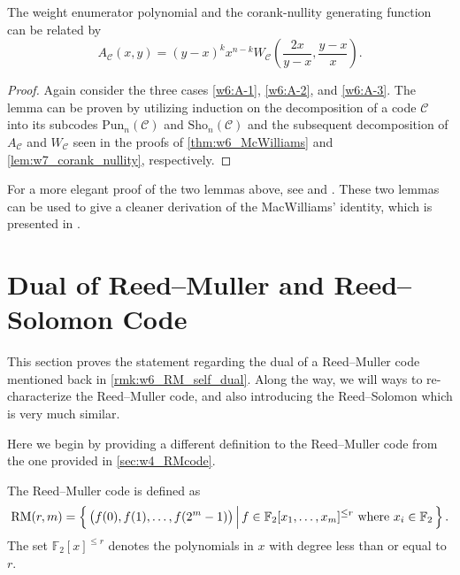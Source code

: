 \begin{lemma}[(Greene's)] \label{lem:w7_Greene}
    The weight enumerator polynomial and the corank-nullity generating function can be related by
    \begin{equation}
        A_\mathcal{C}(x,y) = (y-x)^kx^{n-k} W_\mathcal{C}\left(\frac{2x}{y-x},\frac{y-x}{x}\right).
    \end{equation}
\end{lemma}
\begin{proof}
    Again consider the three cases \ref{w6:A-1}, \ref{w6:A-2}, and \ref{w6:A-3}. The lemma can be proven by utilizing induction on the decomposition of a code $\mathcal{C}$ into its subcodes $\mathrm{Pun}_n(\mathcal{C})$ and $\mathrm{Sho}_n(\mathcal{C})$ and the subsequent decomposition of $A_\mathcal{C}$ and $W_\mathcal{C}$ seen in the proofs of \autoref{thm:w6_McWilliams} and \autoref{lem:w7_corank_nullity}, respectively.
\end{proof}

For a more elegant proof of the two lemmas above, see  and . These two lemmas can be used to give a cleaner derivation of the MacWilliams' identity, which is presented in .








\section{Dual of Reed--Muller and Reed--Solomon Code} \label{sec:w7_RM_RS}

This section proves the statement regarding the dual of a Reed--Muller code mentioned back in \autoref{rmk:w6_RM_self_dual}. Along the way, we will ways to re-characterize the Reed--Muller code, and also introducing the Reed--Solomon which is very much similar.

Here we begin by providing a different definition to the Reed--Muller code from the one provided in \autoref{sec:w4_RMcode}.
\begin{definition}
    The Reed--Muller code is defined as
    \begin{equation}
        \mathrm{RM}(r,m) = \left\{\,{\left(f(0),f(1),\ldots,f(2^m-1)\right)}\,\middle\vert\,{f\in\mathbb{F}_2[x_1,\ldots,x_m]^{\le r}\text{ where }x_i\in\mathbb{F}_2}\,\right\}.
    \end{equation}
    The set $\mathbb{F}_2[x]^{\le r}$ denotes the polynomials in $x$ with degree less than or equal to $r$.
\end{definition}

